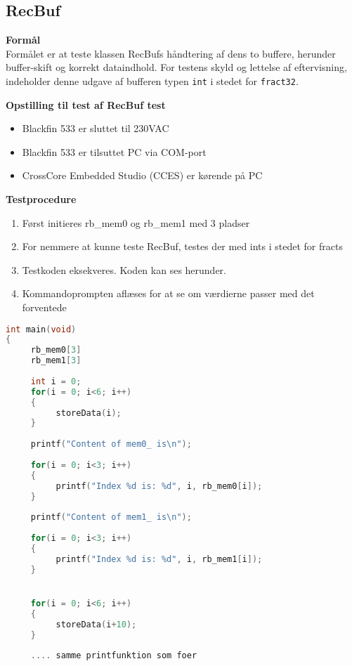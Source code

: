 \subsection*{RecBuf}

\textbf{Formål} \\
Formålet er at teste klassen RecBufs håndtering af dens to buffere, herunder buffer-skift og korrekt dataindhold. For testens skyld og lettelse af eftervisning, indeholder denne udgave af bufferen typen \verb+int+ i stedet for \verb+fract32+.

\textbf{Opstilling til test af RecBuf test}

\begin{itemize}
	\item Blackfin 533 er sluttet til 230VAC
	\item Blackfin 533 er tilsuttet PC via COM-port
	\item CrossCore Embedded Studio (CCES) er kørende på PC
\end{itemize}

\textbf{Testprocedure}
\begin{enumerate}
	\item Først initieres rb\_mem0 og rb\_mem1 med 3 pladser  
	\item For nemmere at kunne teste RecBuf, testes der med ints i stedet for fracts
	\item Testkoden eksekveres. Koden kan ses herunder. 
	\item Kommandoprompten aflæses for at se om værdierne passer med det forventede
\end{enumerate}

\newpage

\begin{lstlisting}[language=C,numbers=none]
int main(void)
{
     rb_mem0[3]
     rb_mem1[3]
     
     int i = 0;
     for(i = 0; i<6; i++)
     {
          storeData(i);
     }
     
     printf("Content of mem0_ is\n");
     
     for(i = 0; i<3; i++)
     {
          printf("Index %d is: %d", i, rb_mem0[i]);
     }
     
     printf("Content of mem1_ is\n");
     
     for(i = 0; i<3; i++)
     {
          printf("Index %d is: %d", i, rb_mem1[i]);
     }


     for(i = 0; i<6; i++)
     {
          storeData(i+10);
     }
     
     .... samme printfunktion som foer      
\end{lstlisting}

